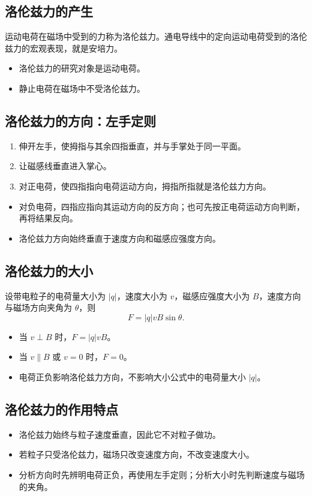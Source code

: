 \documentclass[a4paper,12pt,twoside]{article}
\begin{document}
\subsection{洛伦兹力的产生}
运动电荷在磁场中受到的力称为洛伦兹力。通电导线中的定向运动电荷受到的洛伦兹力的宏观表现，就是安培力。
\begin{itemize}
    \item 洛伦兹力的研究对象是运动电荷。
    \item 静止电荷在磁场中不受洛伦兹力。
\end{itemize}


\subsection{洛伦兹力的方向：左手定则}
\begin{enumerate}
    \item 伸开左手，使拇指与其余四指垂直，并与手掌处于同一平面。
    \item 让磁感线垂直进入掌心。
    \item 对正电荷，使四指指向电荷运动方向，拇指所指就是洛伦兹力方向。
\end{enumerate}
\begin{itemize}
    \item 对负电荷，四指应指向其运动方向的反方向；也可先按正电荷运动方向判断，再将结果反向。
    \item 洛伦兹力方向始终垂直于速度方向和磁感应强度方向。
\end{itemize}


\subsection{洛伦兹力的大小}
设带电粒子的电荷量大小为 \(|q|\)，速度大小为 \(v\)，磁感应强度大小为 \(B\)，速度方向与磁场方向夹角为 \(\theta\)，则
\[
    F=|q|vB\sin\theta.
\]
\begin{itemize}
    \item 当 \(v\perp B\) 时，\(F=|q|vB\)。
    \item 当 \(v\parallel B\) 或 \(v=0\) 时，\(F=0\)。
    \item 电荷正负影响洛伦兹力方向，不影响大小公式中的电荷量大小 \(|q|\)。
\end{itemize}


\subsection{洛伦兹力的作用特点}
\begin{itemize}
    \item 洛伦兹力始终与粒子速度垂直，因此它不对粒子做功。
    \item 若粒子只受洛伦兹力，磁场只改变速度方向，不改变速度大小。
    \item 分析方向时先辨明电荷正负，再使用左手定则；分析大小时先判断速度与磁场的夹角。
\end{itemize}
\end{document}
